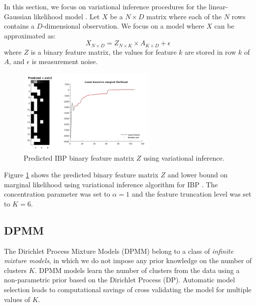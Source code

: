 In this section, we focus on variational inference procedures for the linear-Gaussian likelihood model \cite{DosMilVan2009a}. Let $X$ be a $N\times D$ matrix where each of the $N$ rows contains a $D$-dimensional observation. We focus on a model where $X$ can be approximated as:
\begin{equation}
    X_{N\times D} = Z_{N\times K} \times A_{K\times D} + \epsilon
\end{equation}
where $Z$ is a binary feature matrix, the values for feature $k$ are stored in row $k$ of $A$, and $\epsilon$ is measurement noise.
\begin{figure}[thpb]
    \centering
    \includegraphics[width=0.6\textwidth, trim={10 10 10 10}]{figures/ibp_z.png}
    \caption{Predicted IBP binary feature matrix $Z$ using variational inference.}
    \label{fig:ibp_z}
\end{figure}
Figure \ref{fig:ibp_z} shows the predicted binary feature matrix $Z$ and lower bound on marginal likelihood using variational inference algorithm for IBP \cite{DosMilVan2009a}. The concentration parameter was set to $\alpha=1$ and the feature truncation level was set to $K=6$. 



\subsection{DPMM}

The Dirichlet Process Mixture Models (DPMM) belong to a class of \textit{infinite mixture models}, in which we do not impose any prior knowledge on the number of clusters $K$. DPMM models learn the number of clusters from the data using a non-parametric prior based on the Dirichlet Process (DP). Automatic model selection leads to computational savings of cross validating the model for multiple values of $K$.\\

